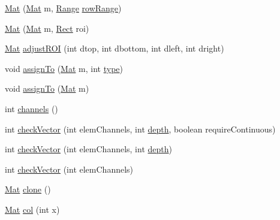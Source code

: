 \begin{DoxyCompactItemize}
\item 
\mbox{\hyperlink{classorg_1_1opencv_1_1core_1_1_mat_ac327cd85a7a77b074525dda13723da60}{Mat}} (\mbox{\hyperlink{classorg_1_1opencv_1_1core_1_1_mat}{Mat}} m, \mbox{\hyperlink{classorg_1_1opencv_1_1core_1_1_range}{Range}} \mbox{\hyperlink{classorg_1_1opencv_1_1core_1_1_mat_a182dbb37bbaa19e65cfcb99cf4d03fbe}{row\+Range}})
\item 
\mbox{\hyperlink{classorg_1_1opencv_1_1core_1_1_mat_aa6ed352a1abaac27fc5f4f8f467269ea}{Mat}} (\mbox{\hyperlink{classorg_1_1opencv_1_1core_1_1_mat}{Mat}} m, \mbox{\hyperlink{classorg_1_1opencv_1_1core_1_1_rect}{Rect}} roi)
\item 
\mbox{\hyperlink{classorg_1_1opencv_1_1core_1_1_mat}{Mat}} \mbox{\hyperlink{classorg_1_1opencv_1_1core_1_1_mat_a76da70f4d8bbf780fc2a351bdffc06ed}{adjust\+R\+OI}} (int dtop, int dbottom, int dleft, int dright)
\item 
void \mbox{\hyperlink{classorg_1_1opencv_1_1core_1_1_mat_a0b4dea332af31a9102b75892f66d0395}{assign\+To}} (\mbox{\hyperlink{classorg_1_1opencv_1_1core_1_1_mat}{Mat}} m, int \mbox{\hyperlink{classorg_1_1opencv_1_1core_1_1_mat_a555bc7243135e2883afe54e7e5e92c79}{type}})
\item 
void \mbox{\hyperlink{classorg_1_1opencv_1_1core_1_1_mat_af363e731446cb340ff5e28e5ac8d5d6f}{assign\+To}} (\mbox{\hyperlink{classorg_1_1opencv_1_1core_1_1_mat}{Mat}} m)
\item 
int \mbox{\hyperlink{classorg_1_1opencv_1_1core_1_1_mat_ababb77842613942b86dad34ec909eacf}{channels}} ()
\item 
int \mbox{\hyperlink{classorg_1_1opencv_1_1core_1_1_mat_ab323ee864f290b7ddbd804a6fbe76ae0}{check\+Vector}} (int elem\+Channels, int \mbox{\hyperlink{classorg_1_1opencv_1_1core_1_1_mat_a9bf4679d10841047167676cde239a5b9}{depth}}, boolean require\+Continuous)
\item 
int \mbox{\hyperlink{classorg_1_1opencv_1_1core_1_1_mat_ae1237684f5ce865f9f74f2de48f73c60}{check\+Vector}} (int elem\+Channels, int \mbox{\hyperlink{classorg_1_1opencv_1_1core_1_1_mat_a9bf4679d10841047167676cde239a5b9}{depth}})
\item 
int \mbox{\hyperlink{classorg_1_1opencv_1_1core_1_1_mat_a336960f25d39af05618890ee00b7e28e}{check\+Vector}} (int elem\+Channels)
\item 
\mbox{\hyperlink{classorg_1_1opencv_1_1core_1_1_mat}{Mat}} \mbox{\hyperlink{classorg_1_1opencv_1_1core_1_1_mat_a7e40ecb438d2ec75e24e209b7bee0be2}{clone}} ()
\item 
\mbox{\hyperlink{classorg_1_1opencv_1_1core_1_1_mat}{Mat}} \mbox{\hyperlink{classorg_1_1opencv_1_1core_1_1_mat_ad1aa7a61ef1c57251d8d4031c541d5f2}{col}} (int x)

\end{DoxyCompactItemize}
